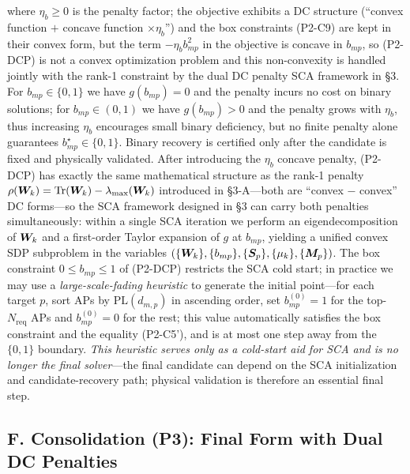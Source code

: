 where $\eta_b \geq 0$ is the penalty factor; the objective exhibits a DC structure (``convex function $+$ concave function $\times \eta_b$'') and the box constraints (P2-C9) are kept in their convex form, but the term $-\eta_b b_{mp}^2$ in the objective is concave in $b_{mp}$, so (P2-DCP) is not a convex optimization problem and this non-convexity is handled jointly with the rank-1 constraint by the dual DC penalty SCA framework in \S3. For $b_{mp} \in \{0,1\}$ we have $g(b_{mp}) = 0$ and the penalty incurs no cost on binary solutions; for $b_{mp} \in (0,1)$ we have $g(b_{mp}) > 0$ and the penalty grows with $\eta_b$, thus increasing $\eta_b$ encourages small binary deficiency, but no finite penalty alone guarantees $b_{mp}^\star\in\{0,1\}$. Binary recovery is certified only after the candidate is fixed and physically validated. After introducing the $\eta_b$ concave penalty, (P2-DCP) has exactly the same mathematical structure as the rank-1 penalty $\rho(\bm{W}_k) = \operatorname{Tr}(\bm{W}_k) - \lambda_{\max}(\bm{W}_k)$ introduced in \S3-A---both are ``convex $-$ convex'' DC forms---so the SCA framework designed in \S3 can carry both penalties simultaneously: within a single SCA iteration we perform an eigendecomposition of $\bm{W}_k$ and a first-order Taylor expansion of $g$ at $b_{mp}$, yielding a unified convex SDP subproblem in the variables $(\{\bm{W}_k\}, \{b_{mp}\}, \{\bm{S}_p\}, \{\mu_k\}, \{\bm{M}_p\})$. The box constraint $0 \leq b_{mp} \leq 1$ of (P2-DCP) restricts the SCA cold start; in practice we may use a \emph{large-scale-fading heuristic} to generate the initial point---for each target $p$, sort APs by $\text{PL}(d_{m,p})$ in ascending order, set $b_{mp}^{(0)} = 1$ for the top-$N_{\text{req}}$ APs and $b_{mp}^{(0)} = 0$ for the rest; this value automatically satisfies the box constraint and the equality (P2-C5'), and is at most one step away from the $\{0,1\}$ boundary. \emph{This heuristic serves only as a cold-start aid for SCA and is no longer the final solver}---the final candidate can depend on the SCA initialization and candidate-recovery path; physical validation is therefore an essential final step.

\subsection*{F. Consolidation (P3): Final Form with Dual DC Penalties}

